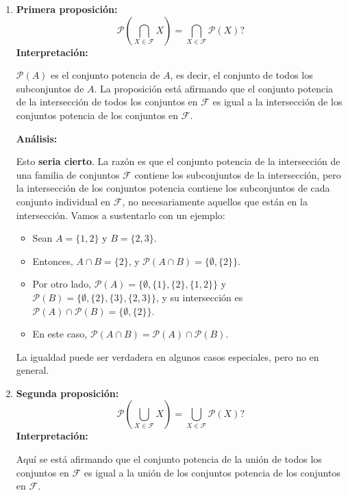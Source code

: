 \begin{solution}
\begin{enumerate}
    \item \textbf{Primera proposición:}
   \[
   \mathscr{P} \left( \bigcap_{X \in \mathscr{F}} X \right) = \bigcap_{X \in \mathscr{F}} \mathscr{P}(X)?
   \]
   \textbf{Interpretación:}

   \( \mathscr{P}(A) \) es el conjunto potencia de \( A \), es decir, el conjunto de todos los subconjuntos de \( A \). La proposición está afirmando que el conjunto potencia de la intersección de todos los conjuntos en \( \mathscr{F} \) es igual a la intersección de los conjuntos potencia de los conjuntos en \( \mathscr{F} \).

   \textbf{Análisis:}

   Esto \textbf{seria cierto}. La razón es que el conjunto potencia de la intersección de una familia de conjuntos \( \mathscr{F} \) contiene los subconjuntos de la intersección, pero la intersección de los conjuntos potencia contiene los subconjuntos de cada conjunto individual en \( \mathscr{F} \), no necesariamente aquellos que están en la intersección. Vamos a sustentarlo con un ejemplo:

   \begin{itemize}
        \item Sean \( A = \{1, 2\} \) y \( B = \{2, 3\} \).
        \item Entonces, \( A \cap B = \{2\} \), y \( \mathscr{P}(A \cap B) = \{ \emptyset, \{2\} \} \).
        \item Por otro lado, \( \mathscr{P}(A) = \{ \emptyset, \{1\}, \{2\}, \{1, 2\} \} \) y \( \mathscr{P}(B) = \{ \emptyset, \{2\}, \{3\}, \{2, 3\} \} \), y su intersección es \( \mathscr{P}(A) \cap \mathscr{P}(B) = \{ \emptyset, \{2\} \} \).
        \item En este caso, \( \mathscr{P}(A \cap B) = \mathscr{P}(A) \cap \mathscr{P}(B) \).
   \end{itemize}

   La igualdad puede ser verdadera en algunos casos especiales, pero no en general.

    \item \textbf{Segunda proposición:}
   \[
   \mathscr{P} \left( \bigcup_{X \in \mathscr{F}} X \right) = \bigcup_{X \in \mathscr{F}} \mathscr{P}(X)?
   \]
   \textbf{Interpretación:}

   Aquí se está afirmando que el conjunto potencia de la unión de todos los conjuntos en \( \mathscr{F} \) es igual a la unión de los conjuntos potencia de los conjuntos en \( \mathscr{F} \).


\end{enumerate}
\end{solution}
